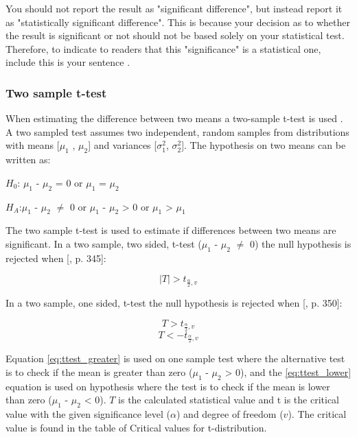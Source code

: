 You should not report the result as "significant difference", but instead report it as "statistically significant difference". This is because your decision as to whether the result is significant or not should not be based solely on your statistical test. Therefore, to indicate to readers that this "significance" is a statistical one, include this is your sentence \citep{LundResearchLtd2013a}. 


\subsubsection{Two sample t-test}\label{sec:t-test}
When estimating the difference between two means a two-sample t-test is used \citep{Walpole2012}. A two sampled test assumes two independent, random samples from distributions with means [$\mu_{1}$ , $\mu_{2}$] and variances [$\sigma_{1}^{2}$, $\sigma_{2}^{2}$]. %
The hypothesis on two means can be written as:\newline

\centerline{$H_{0}$: $\mu_{1}$ - $\mu_{2}$ = 0 or $\mu_{1}$ = $\mu_{2}$} 
\centerline{$H_{A}$:$\mu_{1}$ - $\mu_{2}$ $\neq$ 0 or $\mu_{1}$ - $\mu_{2}$ > 0 or $\mu_{1}$ > $\mu_{1}$}

The two sample t-test is used to estimate if differences between two means are significant. In a two sample, two sided, t-test ($\mu_{1}$ - $\mu_{2}$ $\neq$ 0) the null hypothesis is rejected when [\citep{Walpole2012}, p. 345]:

\begin{equation}
\label{eq:ttest_twoway}
|T| > t_{\frac{\alpha}{2}, v} 
\end{equation}

In a two sample, one sided, t-test the null hypothesis is rejected when [\citep{Walpole2012}, p. 350]:

\begin{equation}
\label{eq:ttest_greater}
T > t_{\frac{\alpha}{2}, v}
\end{equation}
\begin{equation}
\label{eq:ttest_lower}
T < - t_{\frac{\alpha}{2}, v}
\end{equation}

Equation \ref{eq:ttest_greater} is used on one sample test where the alternative test is to check if the mean is greater than zero ($\mu_{1}$ - $\mu_{2}$ > 0), and the \ref{eq:ttest_lower} equation is used on hypothesis where the test is to check if the mean is lower than zero ($\mu_{1}$ - $\mu_{2}$ < 0). $T$ is the calculated statistical value and t is the critical value with the given significance level ($\alpha$) and degree of freedom ($v$). The critical value is found in the table of Critical values for t-distribution. \newline 
 

